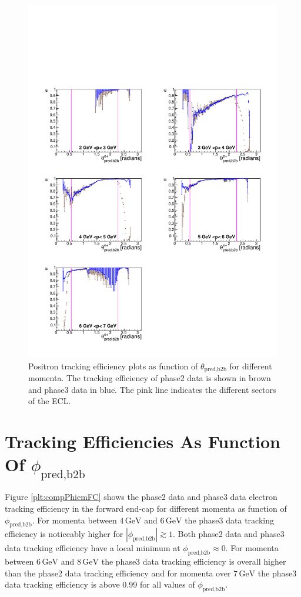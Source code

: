 \documentclass[a4paper,11pt,twosided,final,german,openbib,pdftex,listof=totoc,bibliography=totoc]{scrbook}
\begin{document}
\begin{figure}[!htbp]
	\centering
	\includegraphics[width=\textwidth]{Plots/comp/cMThetaep_Data.pdf}
	\caption[Momentum $\theta_{\textrm{pred,b2b}}$ Positron Efficiency]{Positron tracking efficiency plots as function of $\theta_{\textrm{pred,b2b}}$ for different momenta. The tracking efficiency of phase2 data is shown in brown and phase3 data in blue. The pink line indicates the different sectors of the ECL.}
	\label{plt:compThetaep}
\end{figure}

\newpage 

\section{Tracking Efficiencies As Function Of $\phi_{\textrm{pred,b2b}}$}

Figure \ref{plt:compPhiemFC} shows the phase2 data and phase3 data electron tracking efficiency in the forward end-cap for different momenta as function of $\phi_{\textrm{pred,b2b}}$. 
For momenta between $4\,\textrm{GeV}$ and $6\,\textrm{GeV}$ the phase3 data tracking efficiency is noticeably higher for $|\phi_{\textrm{pred,b2b}}| \gtrsim 1$. Both phase2 data and phase3 data tracking efficiency have a local minimum at $\phi_{\textrm{pred,b2b}} \approx 0$. 
For momenta between $6\,\textrm{GeV}$ and $8\,\textrm{GeV}$ the phase3 data tracking efficiency is overall higher than the phase2 data tracking efficiency and for momenta over $7\,\textrm{GeV}$ the phase3 data tracking efficiency is above 0.99 for all values of $\phi_{\textrm{pred,b2b}}$.
\end{document}
